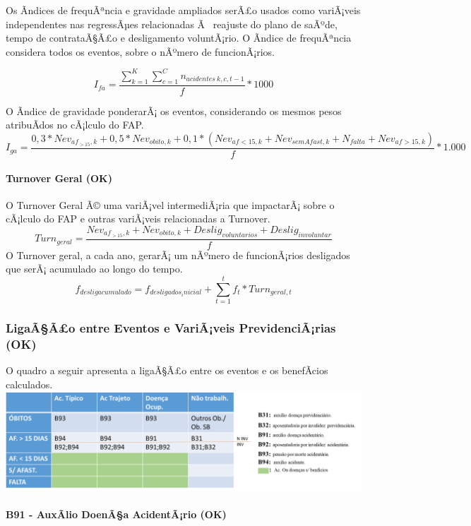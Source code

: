 \documentclass[]{article}
\let\oldparagraph\paragraph
\renewcommand{\paragraph}[1]{\oldparagraph{#1}\mbox{}}
\begin{document}
Os Ã­ndices de frequÃªncia e gravidade ampliados serÃ£o usados como
variÃ¡veis independentes nas regressÃµes relacionadas Ã~ reajuste do
plano de saÃºde, tempo de contrataÃ§Ã£o e desligamento voluntÃ¡rio. O
Ã­ndice de frequÃªncia considera todos os eventos, sobre o nÃºmero de
funcionÃ¡rios.

\[I_{fa} = \frac{\sum_{k=1}^{K} {\sum_{c=1}^{C} {n_{acidentes \ k,c, t-1}}}}{f} * 1000\]

O Ã­ndice de gravidade ponderarÃ¡ os eventos, considerando os mesmos
pesos atribuÃ­dos no cÃ¡lculo do FAP.
\[I_{ga} = \frac{0,3 * Nev_{af_{>15},k} + 0,5 * Nev_{obito, k} + 0,1 * (Nev_{af<15,k} + Nev_{semAfast,k} + N_{falta} + Nev_{af>15,k})}{f}* 1.000\]

\paragraph{Turnover Geral (OK)}\label{turnover-geral-ok}

O Turnover Geral Ã© uma variÃ¡vel intermediÃ¡ria que impactarÃ¡ sobre o
cÃ¡lculo do FAP e outras variÃ¡veis relacionadas a Turnover.
\[Turn_{geral} = \frac{Nev_{af_{>15},k} + Nev_{obito,k} + Deslig_{voluntarios} + Deslig_{involuntar}}{f}\]
O Turnover geral, a cada ano, gerarÃ¡ um nÃºmero de funcionÃ¡rios
desligados que serÃ¡ acumulado ao longo do tempo.
\[f_{desligacumulado} = f_{desligados_inicial} + \sum_{t=1}^{t} f_t * Turn_{geral,t} \]

\subsubsection{LigaÃ§Ã£o entre Eventos e VariÃ¡veis PrevidenciÃ¡rias
(OK)}\label{ligaaao-entre-eventos-e-variaveis-previdenciarias-ok}

O quadro a seguir apresenta a ligaÃ§Ã£o entre os eventos e os
benefÃ­cios calculados.
\includegraphics{../figures/quadro_beneficios.png}

\paragraph{B91 - AuxÃ­lio DoenÃ§a AcidentÃ¡rio
(OK)}\label{b91---auxalio-doenaa-acidentario-ok}
\end{document}
